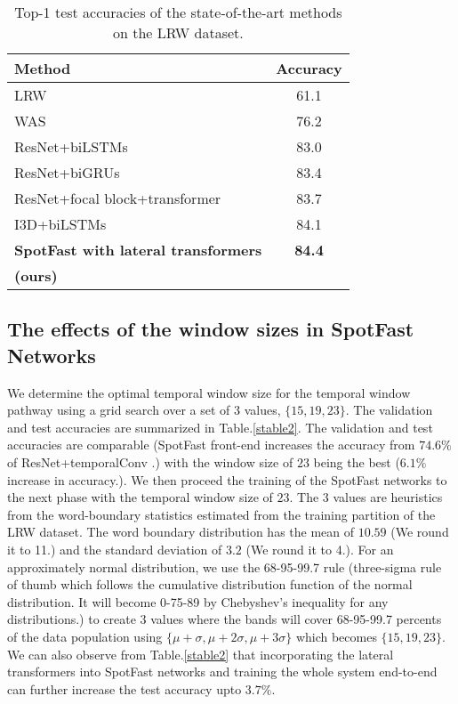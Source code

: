 \documentclass{article}
\begin{document}
\begin{table}[] \label{stable1}
\centering
\caption{Top-1 test accuracies of the state-of-the-art methods on the LRW dataset.}
\vspace{0.5\baselineskip}
\label{stable1}
\begin{tabular}{l|c}
\hline
 Method    & Accuracy  \\
\hline
 LRW \cite{chung2016lip} & 61.1  \\
WAS \cite{chung2017lip} & 76.2   \\
ResNet+biLSTMs \cite{stafylakis2017combining} & 83.0 \\
ResNet+biGRUs \cite{petridis2018end} & 83.4 \\
ResNet+focal block+transformer \cite{Zhang_2019_ICCV} & 83.7   \\ 
I3D+biLSTMs \cite{weng2019learning} & 84.1   \\ 
\hline
\textbf{SpotFast with lateral transformers} &  \textbf{84.4}  \\
\textbf{(ours)} & \\
\hline
\end{tabular}
\end{table}

\subsection{The effects of the window sizes in SpotFast Networks}
We determine the optimal temporal window size for the temporal window pathway using a grid search over a set of $3$ values, $\{15, 19, 23\}$. The validation and test accuracies are summarized in Table.\ref{stable2}. The validation and test accuracies are comparable (SpotFast front-end increases the accuracy from $74.6\%$ of ResNet+temporalConv \cite{stafylakis2017combining}.) with the window size of $23$ being the best ($6.1\%$ increase in accuracy.). We then proceed the training of the SpotFast networks to the next phase with the temporal window size of $23$. The $3$ values are heuristics from the word-boundary statistics estimated from the training partition of the LRW dataset. The word boundary distribution has the mean of $10.59$ (We round it to 11.) and the standard deviation of $3.2$ (We round it to 4.). For an approximately normal distribution, we use the 68-95-99.7 rule (three-sigma rule of thumb which follows the cumulative distribution function of the normal distribution. It will become 0-75-89 by Chebyshev's inequality for any distributions.) to create $3$ values where the bands will cover 68-95-99.7 percents of the data population using $\{\mu+\sigma, \mu+2\sigma, \mu+3\sigma\}$ which becomes $\{15, 19, 23\}$. We can also observe from Table.\ref{stable2} that incorporating the lateral transformers into SpotFast networks and training the whole system end-to-end can further increase the test accuracy upto $3.7\%$.
\end{document}
